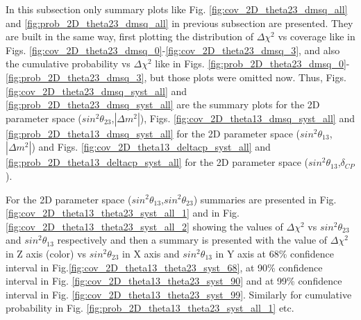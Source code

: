 In this subsection only summary plots like Fig. \ref{fig:cov_2D_theta23_dmsq_all} and \ref{fig:prob_2D_theta23_dmsq_all} in previous subsection are presented. They are built in the same way, first plotting the distribution of $\Delta\chi^{2}$ vs coverage like in Figs. \ref{fig:cov_2D_theta23_dmsq_0}-\ref{fig:cov_2D_theta23_dmsq_3}, and also the cumulative probability vs $\Delta\chi^{2}$ like in Figs. \ref{fig:prob_2D_theta23_dmsq_0}-\ref{fig:prob_2D_theta23_dmsq_3}, but those plots were omitted now. 
Thus, Figs.\ref{fig:cov_2D_theta23_dmsq_syst_all} and \ref{fig:prob_2D_theta23_dmsq_syst_all} are the summary plots for the 2D parameter space ($sin^{2}\theta_{23}$,$|\Delta m^{2}|$), Figs. \ref{fig:cov_2D_theta13_dmsq_syst_all} and \ref{fig:prob_2D_theta13_dmsq_syst_all}  for the 2D parameter space ($sin^{2}\theta_{13}$,$|\Delta m^{2}|$) and Figs.  \ref{fig:cov_2D_theta13_deltacp_syst_all} and \ref{fig:prob_2D_theta13_deltacp_syst_all} for the 2D parameter space ($sin^{2}\theta_{13}$,$\delta_{CP}$).

For the 2D parameter space ($sin^{2}\theta_{13}$,$sin^{2}\theta_{23}$) summaries are presented in Fig. \ref{fig:cov_2D_theta13_theta23_syst_all_1} and in Fig. \ref{fig:cov_2D_theta13_theta23_syst_all_2} showing the values of $\Delta\chi^{2}$ vs $sin^{2}\theta_{23}$ and $sin^{2}\theta_{13}$ respectively and then a summary is presented with the value of $\Delta\chi^{2}$ in Z axis (color) vs $sin^{2}\theta_{23}$ in X axis and $sin^{2}\theta_{13}$ in Y axis at 68\% confidence interval in Fig.\ref{fig:cov_2D_theta13_theta23_syst_68}, at 90\% confidence interval in Fig. \ref{fig:cov_2D_theta13_theta23_syst_90} and at 99\%  confidence interval in Fig. \ref{fig:cov_2D_theta13_theta23_syst_99}.
Similarly for cumulative probability in Fig. \ref{fig:prob_2D_theta13_theta23_syst_all_1}  etc. 


